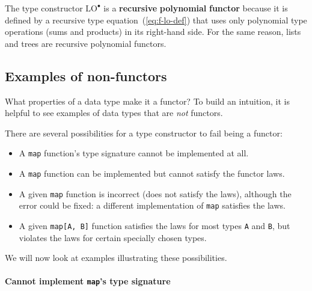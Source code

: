 The type constructor $\text{LO}^{\bullet}$ is a \textbf{recursive}
\textbf{polynomial} \textbf{functor}
because it is defined by a recursive type equation~(\ref{eq:f-lo-def})
that uses only polynomial type operations (sums and products) in its
right-hand side. For the same reason, lists and trees are recursive
polynomial functors.

\subsection{Examples of non-functors\label{subsec:Examples-of-non-functors}}

What properties of a data type make it a functor? To build an intuition,
it is helpful to see examples of data types that are \emph{not} functors.

There are several possibilities for a type constructor to fail being
a functor:
\begin{itemize}
\item A \lstinline!map! function's type signature cannot be implemented
at all.
\item A \lstinline!map! function can be implemented but cannot satisfy
the functor laws.
\item A given \lstinline!map! function is incorrect (does not satisfy the
laws), although the error could be fixed: a different implementation
of \lstinline!map! satisfies the laws.
\item A given \lstinline!map[A, B]! function satisfies the laws for most
types \lstinline!A! and \lstinline!B!, but violates the laws for
certain specially chosen types.
\end{itemize}
We will now look at examples illustrating these possibilities.

\paragraph{Cannot implement \lstinline!map!'s type signature}

